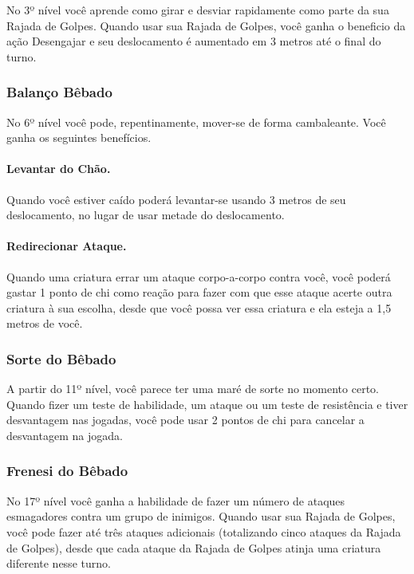 \begin{multicols}{2}
No 3º nível você aprende como girar e desviar rapidamente como parte da sua
Rajada de Golpes. Quando usar sua Rajada de Golpes, você ganha o beneficio da
ação Desengajar e seu deslocamento é aumentado em 3 metros até o final do turno.

\subsubsection*{Balanço Bêbado}%
\label{ssub:balanco_bebado}

No 6º nível você pode, repentinamente, mover-se de forma cambaleante. Você ganha
os seguintes benefícios.

\paragraph{Levantar do Chão.}%
Quando você estiver caído poderá levantar-se usando 3 metros de seu
deslocamento, no lugar de usar metade do deslocamento.

\paragraph{Redirecionar Ataque.}%
Quando uma criatura errar um ataque corpo-a-corpo contra você, você poderá
gastar 1 ponto de chi como reação para fazer com que esse ataque acerte outra
criatura à sua escolha, desde que você possa ver essa criatura e ela esteja a
1,5 metros de você.

\subsubsection*{Sorte do Bêbado}%
\label{ssub:sorte_do_bebado}

A partir do 11º nível, você parece ter uma maré de sorte no momento certo.
Quando fizer um teste de habilidade, um ataque ou um teste de resistência e
tiver desvantagem nas jogadas, você pode usar 2 pontos de chi para cancelar a
desvantagem na jogada.

\subsubsection*{Frenesi do Bêbado}%
\label{ssub:frenesi_do_bebado}

No 17º nível você ganha a habilidade de fazer um número de ataques esmagadores
contra um grupo de inimigos. Quando usar sua Rajada de Golpes, você pode fazer
até três ataques adicionais (totalizando cinco ataques da Rajada de Golpes),
desde que cada ataque da Rajada de Golpes atinja uma criatura diferente nesse
turno.


\end{multicols}
